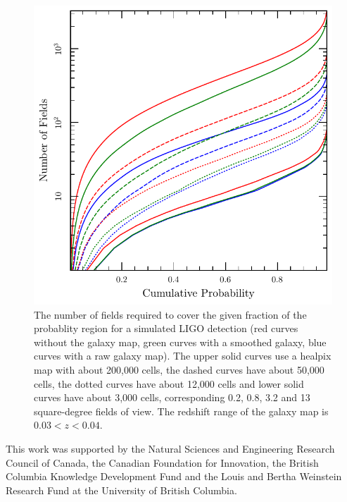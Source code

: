 \documentclass[useAMS,usenatbib]{mn2e}
\begin{document}
\begin{figure}
  \includegraphics[width=\columnwidth]{T125738_bayestar}
  \caption{The number of fields required to cover the given fraction
    of the probablity region for a simulated LIGO detection (red
    curves without the galaxy map, green curves with a smoothed
    galaxy, blue curves with a raw galaxy map).  The upper solid
    curves use a healpix map with about 200,000 cells, the dashed
    curves have about 50,000 cells, the dotted curves have about
    12,000 cells and lower solid curves have about 3,000 cells,
    corresponding 0.2, 0.8, 3.2 and 13 square-degree fields of view. The redshift range of the galaxy map is $0.03<z<0.04$.}
\end{figure}

This work was supported by the Natural Sciences and Engineering
Research Council of Canada, the Canadian Foundation for Innovation,
the British Columbia Knowledge Development Fund and the Louis and
Bertha Weinstein Research Fund at the University of British Columbia.





\label{lastpage}
\end{document}
